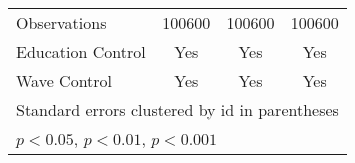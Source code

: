 {\begin{tabular}{l*{3}{c}}
\hline
Observations        &      100600         &      100600         &      100600         \\
Education Control   &         Yes         &         Yes         &         Yes         \\
Wave Control        &         Yes         &         Yes         &         Yes         \\
\hline\hline
\multicolumn{4}{l}{\footnotesize \footnotesize Standard errors clustered by id in parentheses}\\
\multicolumn{4}{l}{\footnotesize \footnotesize \sym{*} \(p<0.05\), \sym{**} \(p<0.01\), \sym{***} \(p<0.001\)}\\
\end{tabular}
}
